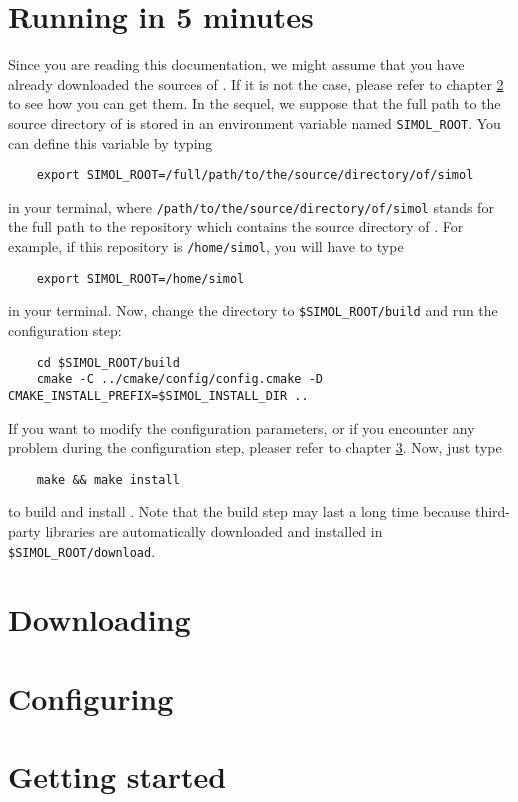 
\chapter{Running \Simol in 5 minutes}


Since you are reading this documentation, we might assume that you have already downloaded the sources of \Simol. If it is not the case, please refer to chapter \ref{chap:download} to see how you can get them. In the sequel, we suppose that the full path to the source directory of \Simol is stored in an environment variable named \texttt{SIMOL\_ROOT}. You can define this variable by typing 
\begin{verbatim}
    export SIMOL_ROOT=/full/path/to/the/source/directory/of/simol
\end{verbatim}
in your terminal, where \texttt{/path/to/the/source/directory/of/simol} stands for the full path to the repository which contains the source directory of \Simol. For example, if this repository is \texttt{/home/simol}, you will have to type
\begin{verbatim}
    export SIMOL_ROOT=/home/simol
\end{verbatim}
in your terminal. Now, change the directory to \texttt{\$SIMOL\_ROOT/build} and run the configuration step:
\begin{verbatim}
    cd $SIMOL_ROOT/build
    cmake -C ../cmake/config/config.cmake -D CMAKE_INSTALL_PREFIX=$SIMOL_INSTALL_DIR ..
\end{verbatim}
If you want to modify the configuration parameters, or if you encounter any problem during the configuration step, pleaser refer to chapter \ref{chap:configure}. Now, just type
\begin{verbatim}
    make && make install
\end{verbatim}
to build and install \Simol. Note that the build step may last a long time because third-party libraries are automatically downloaded and installed in \texttt{\$SIMOL\_ROOT/download}. 

\chapter{Downloading \Simol}\label{chap:download}


\chapter{Configuring \Simol}\label{chap:configure}


\chapter{Getting started}


